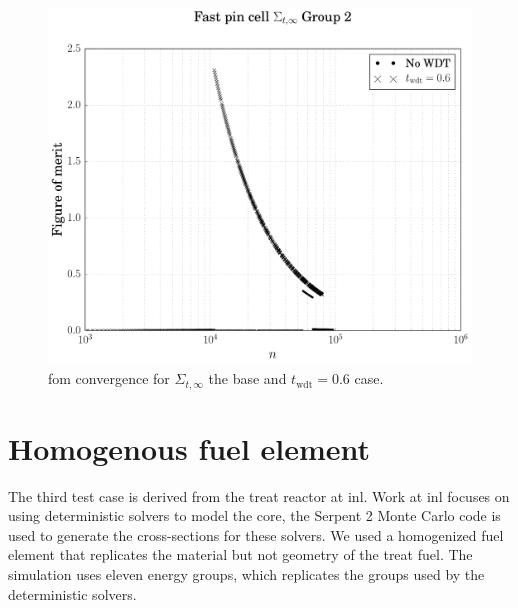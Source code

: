 \begin{figure}[hbtp]
  \centering
  \includegraphics[scale=0.5]{images/results/fast_inf_tot_example}
  \caption[\Acrshort{fom} convergence for $\Sigma_{t,\infty}$ the base
  and $t_{\mathrm{wdt}} = 0.6$ case.]{\Acrshort{fom} convergence for
    $\Sigma_{t,\infty}$ the base and $t_{\mathrm{wdt}} = 0.6$ case.}
  \label{fig:fast_inf_tot_example}
\end{figure}
\newpage
\section{Homogenous fuel element}
\label{sec:homog}

The third test case is derived from the \gls{treat} reactor at
\gls{inl}. Work at \gls{inl} focuses on using deterministic solvers to
model the core, the Serpent 2 Monte Carlo code is used to generate the
cross-sections for these solvers. We used a homogenized fuel element
that replicates the material but not geometry of the \gls{treat}
fuel. The simulation uses eleven energy groups, which replicates the
groups used by the deterministic solvers.




